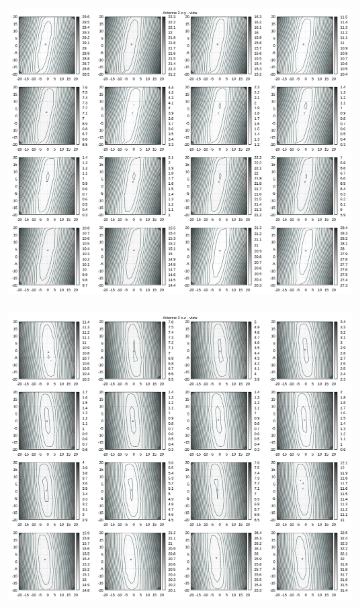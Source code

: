 \begin{appendix}
\begin{figure}[!ht]
\begin{subfigure}[t]{0.3\textwidth}
	\end{subfigure}
\\
	\centering
	\begin{subfigure}[t]{0.3\textwidth}
	     \centering
	     \includegraphics[width=\textwidth]{img/fitness/xy/a2.png}
	\end{subfigure}
	\begin{subfigure}[t]{0.3\textwidth}
		\centering
	     \includegraphics[width=\textwidth]{img/fitness/xz/a2.png}

\end{subfigure}
\end{figure}
\end{appendix}
